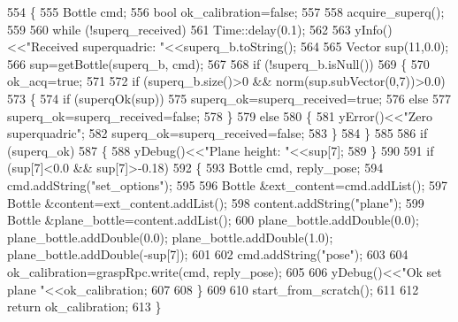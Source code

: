 \begin{DoxyCode}
554     \{
555         Bottle cmd;
556         \textcolor{keywordtype}{bool} ok\_calibration=\textcolor{keyword}{false};
557         
558         acquire_superq();
559       
560         \textcolor{keywordflow}{while} (!superq\_received)
561             Time::delay(0.1);
562 
563         yInfo()<<\textcolor{stringliteral}{"Received superquadric: "}<<superq\_b.toString();
564 
565         Vector sup(11,0.0);
566         sup=getBottle(superq\_b, cmd);
567 
568         \textcolor{keywordflow}{if} (!superq\_b.isNull())
569         \{
570             ok\_acq=\textcolor{keyword}{true};
571 
572             \textcolor{keywordflow}{if} (superq\_b.size()>0 && norm(sup.subVector(0,7))>0.0)
573            \{
574                 \textcolor{keywordflow}{if} (superqOk(sup))
575                     superq\_ok=superq\_received=\textcolor{keyword}{true};
576                 \textcolor{keywordflow}{else}
577                     superq\_ok=superq\_received=\textcolor{keyword}{false};
578             \}
579             \textcolor{keywordflow}{else}
580             \{
581                 yError()<<\textcolor{stringliteral}{"Zero superquadric"};
582                 superq\_ok=superq\_received=\textcolor{keyword}{false};
583             \}
584         \}
585 
586         \textcolor{keywordflow}{if} (superq\_ok)
587         \{
588             yDebug()<<\textcolor{stringliteral}{"Plane height: "}<<sup[7];
589         \}
590 
591         \textcolor{keywordflow}{if} (sup[7]<0.0 && sup[7]>-0.18)
592         \{
593             Bottle cmd, reply\_pose;
594             cmd.addString(\textcolor{stringliteral}{"set\_options"});
595 
596             Bottle &ext\_content=cmd.addList();
597             Bottle &content=ext\_content.addList();
598             content.addString(\textcolor{stringliteral}{"plane"});
599             Bottle &plane\_bottle=content.addList();
600             plane\_bottle.addDouble(0.0); plane\_bottle.addDouble(0.0); plane\_bottle.addDouble(1.0); 
      plane\_bottle.addDouble(-sup[7]);
601 
602             cmd.addString(\textcolor{stringliteral}{"pose"});
603 
604             ok\_calibration=graspRpc.write(cmd, reply\_pose);
605 
606             yDebug()<<\textcolor{stringliteral}{"Ok set plane "}<<ok\_calibration;
607 
608         \}
609 
610         start_from_scratch();
611 
612         \textcolor{keywordflow}{return} ok\_calibration;
613     \}
\end{DoxyCode}
